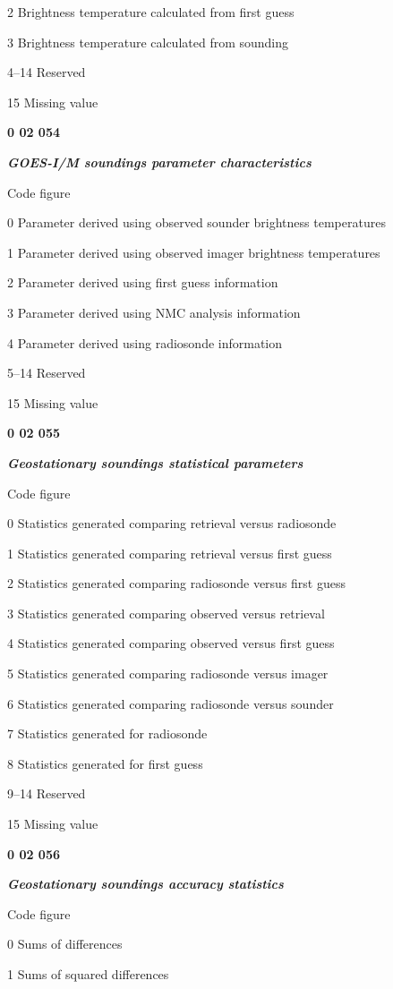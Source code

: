 2 Brightness temperature calculated from first guess

3 Brightness temperature calculated from sounding

4--14 Reserved

15 Missing value

\textbf{0 02 054}

\emph{\textbf{GOES-I/M soundings parameter characteristics}}

Code figure

0 Parameter derived using observed sounder brightness temperatures

1 Parameter derived using observed imager brightness temperatures

2 Parameter derived using first guess information

3 Parameter derived using NMC analysis information

4 Parameter derived using radiosonde information

5--14 Reserved

15 Missing value

\textbf{0 02 055}

\emph{\textbf{Geostationary soundings statistical parameters}}

Code figure

0 Statistics generated comparing retrieval versus radiosonde

1 Statistics generated comparing retrieval versus first guess

2 Statistics generated comparing radiosonde versus first guess

3 Statistics generated comparing observed versus retrieval

4 Statistics generated comparing observed versus first guess

5 Statistics generated comparing radiosonde versus imager

6 Statistics generated comparing radiosonde versus sounder

7 Statistics generated for radiosonde

8 Statistics generated for first guess

9--14 Reserved

15 Missing value

\textbf{0 02 056}

\emph{\textbf{Geostationary soundings accuracy statistics}}

Code figure

0 Sums of differences

1 Sums of squared differences

